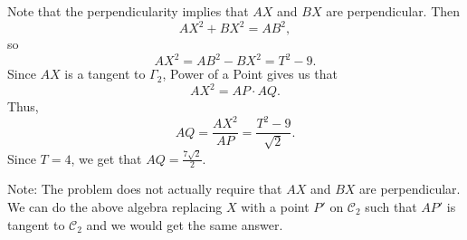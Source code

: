 Note that the perpendicularity implies that $AX$ and $BX$ are perpendicular. Then \[AX^2+BX^2=AB^2,\] so \[AX^2=AB^2-BX^2=T^2-9.\] Since $AX$ is a tangent to $\Gamma_2$, Power of a Point gives us that \[AX^2=AP\cdot AQ.\] Thus, \[AQ=\frac{AX^2}{AP}=\frac{T^2-9}{\sqrt{2}}.\] Since $T=4$, we get that $AQ=\boxed{\frac{7\sqrt{2}}{2}}$.

Note: The problem does not actually require that $AX$ and $BX$ are perpendicular. We can do the above algebra replacing $X$ with a point $P'$ on $\mathcal{C}_2$ such that $AP'$ is tangent to $\mathcal{C}_2$ and we would get the same answer.